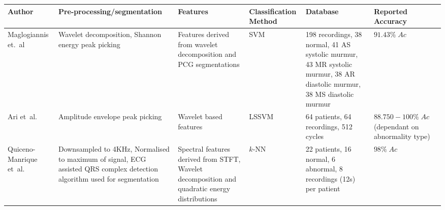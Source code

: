 \documentclass[titlepage, 12pt]{scrartcl} \usepackage{enumitem}
\newcommand{\dtoprule}{\specialrule{1pt}{0pt}{1.4pt}%
            \specialrule{1pt}{0pt}{\belowrulesep}%
            }
\begin{document}
\begin{landscape}
\begin{table}[htbp]
    \label{PriorWorkTable}
\scriptsize
{}
\label{SumPrior}
\doublespacing
\begin{tabulary}{\linewidth}{LLLLLL}
\dtoprule
Author                   & Pre-processing/segmentation                                                                                                               & Features                                                                                                        & Classification Method & Database                                                                                                                 & Reported Accuracy                                  \\ \hline
Maglogiannis et.~al \citeyearpar{Maglogiannis2009}     & Wavelet decomposition, Shannon energy peak picking                                                                                        & Features derived from wavelet decomposition and PCG segmentations                                               & SVM                   & 198 recordings, 38 normal, 41 AS systolic murmur, 43 MR systolic murmur, 38 AR diastolic murmur, 38 MS diastolic murmur & $91.43\%\;Ac$                                      \\
Ari et~al. \citeyearpar{Ari2010}              & Amplitude envelope peak picking~\parencite{Ari2007}                                                                                       & Wavelet based features                                                                                          & LSSVM                 & 64 patients, 64 recordings, 512 cycles                                                                                  & $88.750-100\%\;Ac$ (dependant on abnormality type) \\
Quiceno-Manrique et~al. \citeyearpar{Quiceno-Manrique2010a}& Downsampled to 4KHz, Normalised to maximum of signal, ECG assisted QRS complex detection algorithm used for segmentation                  & Spectral features derived from STFT, Wavelet decomposition and quadratic energy distributions                   & $k$-NN                & 22 patients, 16 normal, 6 abnormal, 8 recordings (12s) per patient                                                      & $98\%\;Ac$                                         \\

\end{tabulary}
\end{table}
\end{landscape}
\end{document}
